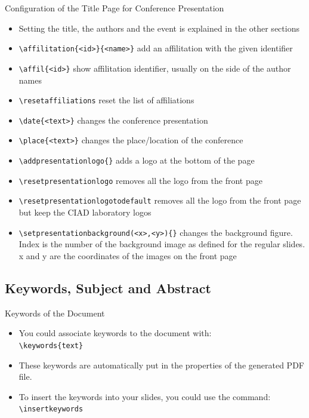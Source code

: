 \documentclass[english,sectioncirclenumberstyle]{ciadbeamer}
\begin{document}
\begin{frame}{{Configuration} of the Title Page for Conference Presentation}
	\begin{itemize}
	\item Setting the title, the authors and the event is explained in the other sections
	\item \texttt{{\textbackslash}affilitation\{<id>\}\{<name>\}} add an affilitation with the given identifier
	\item \texttt{{\textbackslash}affil\{<id>\}} show affilitation identifier, usually on the side of the author names
	\item \texttt{{\textbackslash}resetaffiliations} reset the list of affiliations
	\item \texttt{{\textbackslash}date\{<text>\}} changes the conference presentation
	\item \texttt{{\textbackslash}place\{<text>\}} changes the place/location of the conference
	\item \texttt{{\textbackslash}addpresentationlogo\{<image path>\}} adds a logo at the bottom of the page
	\item \texttt{{\textbackslash}resetpresentationlogo} removes all the logo from the front page
	\item \texttt{{\textbackslash}resetpresentationlogotodefault} removes all the logo from the front page but keep the CIAD laboratory logos
	\item \texttt{{\textbackslash}setpresentationbackground(<x>,<y>)\{<background index>\}} changes the background figure. Index is the number of the background image as defined for the regular slides. x and y are the coordinates of the images on the front page
	\end{itemize}
\end{frame}

\subsection{Keywords, Subject and Abstract}

\begin{frame}{Keywords of the Document}
	\begin{itemize}
	\item You could associate keywords to the document with: \\
		\texttt{{\textbackslash}keywords\{text\}}
	\vspace{1em}
	\item These keywords are automatically put in the properties of the generated PDF file.
	\vspace{1em}
	\item To insert the keywords into your slides, you could use the command: \\
			\texttt{{\textbackslash}insertkeywords}
	\end{itemize}
	\begin{example}
		\insertkeywords
	\end{example}
\end{frame}
\end{document}
